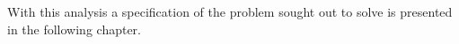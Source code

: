 With this analysis a specification of the problem sought out to solve is presented in the following chapter.
%
%
%
%
%
%
%
%
